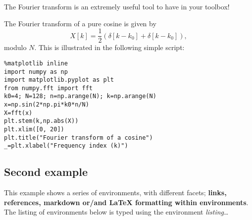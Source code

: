     \begin{textboxa}
The Fourier transform is an extremely useful tool to have in your toolbox!
\end{textboxa}

    The Fourier transform of a pure cosine is given by \[
X[k] = \frac{1}{2} \left( \delta[k-k_0] + \delta[k-k_0] \right), 
\] modulo \(N\). This is illustrated in the following simple script:
%
\begin{lstlisting}
%matplotlib inline
import numpy as np
import matplotlib.pyplot as plt 
from numpy.fft import fft
k0=4; N=128; n=np.arange(N); k=np.arange(N)
x=np.sin(2*np.pi*k0*n/N)
X=fft(x)
plt.stem(k,np.abs(X))
plt.xlim([0, 20])
plt.title("Fourier transform of a cosine")
_=plt.xlabel("Frequency index (k)")
\end{lstlisting}%
    \begin{center}
    \end{center}
    
    \subsection{Second example}\label{second-example}

    This example shows a series of environments, with different facets;
\textbf{links, references, markdown or/and LaTeX formatting within
environments}. The listing of environments below is typed using the
environment \emph{listing}\ldots{}

